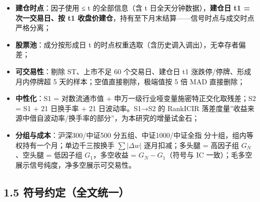 \documentclass[UTF8,a4paper,zihao=-4,fontset=windows]{ctexart}
\providecommand{\tightlist}{\setlength{\itemsep}{0pt}\setlength{\parskip}{0pt}}
\begin{document}
\begin{itemize}
\tightlist
\item
  \textbf{建仓时点}：因子使用 ≤ t 的全部信息（含 t
  日全天分钟数据），\textbf{建仓日 t1 = 次一交易日、按 t1
  收盘价建仓}，持有至下月末结算------信号时点与成交时点严格分离；
\item
  \textbf{股票池}：成分按形成日 t
  的时点权重选取（含历史调入调出），无幸存者偏差；
\item
  \textbf{可交易性}：剔除 ST、上市不足 60 个交易日、建仓日 t1
  涨跌停/停牌、形成月内停牌超 5 天的样本；空值直接剔除，极端值按 5 倍
  MAD 直接删除；
\item
  \textbf{中性化}：S1 = 对数流通市值 +
  申万一级行业哑变量施密特正交化取残差；S2 = S1 + 21 日换手率 + 21
  日波动率。S1→S2 的 RankICIR
  落差度量''收益来源中借自波动率/换手率的部分''，为本研究的增量试金石；
\item
  \textbf{分组与成本}：沪深300/中证500 分五组、中证1000/中证全指
  分十组，组内等权持有一个月；单边千三按换手 \(\sum|\Delta w|\)
  逐月扣减；多头腿 = 高因子组 \(G_N\)、空头腿 = 低因子组
  \(G_1\)，多空收益 = \(G_N-G_1\)（符号与 IC
  一致）；毛多空展示信号纯度，净多空展示可交易性。
\end{itemize}

\subsection{1.5
符号约定（全文统一）}\label{ux7b26ux53f7ux7ea6ux5b9aux5168ux6587ux7edfux4e00}
\end{document}
